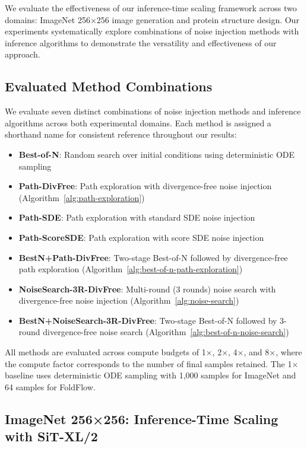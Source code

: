 \documentclass{article}
\begin{document}
We evaluate the effectiveness of our inference-time scaling framework across two domains: ImageNet 256×256 image generation and protein structure design. Our experiments systematically explore combinations of noise injection methods with inference algorithms to demonstrate the versatility and effectiveness of our approach.

\subsection{Evaluated Method Combinations}

We evaluate seven distinct combinations of noise injection methods and inference algorithms across both experimental domains. Each method is assigned a shorthand name for consistent reference throughout our results:

\begin{itemize}
\item \textbf{Best-of-N}: Random search over initial conditions using deterministic ODE sampling
\item \textbf{Path-DivFree}: Path exploration with divergence-free noise injection (Algorithm~\ref{alg:path-exploration})
\item \textbf{Path-SDE}: Path exploration with standard SDE noise injection 
\item \textbf{Path-ScoreSDE}: Path exploration with score SDE noise injection
\item \textbf{BestN+Path-DivFree}: Two-stage Best-of-N followed by divergence-free path exploration (Algorithm~\ref{alg:best-of-n-path-exploration})
\item \textbf{NoiseSearch-3R-DivFree}: Multi-round (3 rounds) noise search with divergence-free noise injection (Algorithm~\ref{alg:noise-search})
\item \textbf{BestN+NoiseSearch-3R-DivFree}: Two-stage Best-of-N followed by 3-round divergence-free noise search (Algorithm~\ref{alg:best-of-n-noise-search})
\end{itemize}

All methods are evaluated across compute budgets of 1×, 2×, 4×, and 8×, where the compute factor corresponds to the number of final samples retained. The 1× baseline uses deterministic ODE sampling with 1,000 samples for ImageNet and 64 samples for FoldFlow.

\subsection{ImageNet 256×256: Inference-Time Scaling with SiT-XL/2}
\end{document}
